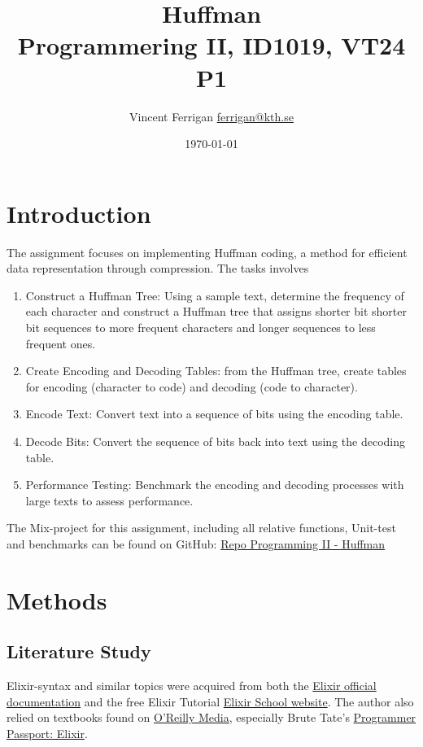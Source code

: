 \documentclass[a4paper,11pt]{article}
\begin{document}
\title{
    Huffman
\\\small{Programmering II, ID1019, VT24 P1}
}
\author{Vincent Ferrigan \href{mailto:ferrigan@kth.se}{ferrigan@kth.se}}

\date{\today}
\maketitle

\section*{Introduction}
\label{sec:introduction}
The assignment focuses on implementing Huffman coding, a method for
efficient data representation through compression.
The tasks involves
\begin{enumerate}
    \item Construct a Huffman Tree:
    Using a sample text, determine the frequency of each character and construct a Huffman tree that assigns shorter bit shorter bit sequences to more frequent characters and longer sequences to less frequent ones.
    \item Create Encoding and Decoding Tables: 
    from the Huffman tree, create tables for encoding (character to code) and decoding (code to character).
    \item Encode Text:
    Convert text into a sequence of bits using the encoding table.
    \item Decode Bits: 
    Convert the sequence of bits back into text using the decoding table.
    \item Performance Testing: 
    Benchmark the encoding and decoding processes with large texts to assess
    performance.
\end{enumerate}

The Mix-project for this assignment, including all relative functions, Unit-test and benchmarks can be found on GitHub:
\href{https://github.com/VincentFerrigan/kth-id1019-programming-ii/tree/main/tasks/8/huffman}{Repo Programming II - Huffman}%

\clearpage
\section*{Methods}\label{sec:methods}
\subsection*{Literature Study}
\label{subsec:literaturestudy}
Elixir-syntax and similar topics were acquired
from both the
\href{https://elixir-lang.org/docs.html}{Elixir official documentation}
and the free Elixir Tutorial
\href{https://elixirschool.com/en}{Elixir School
website}.
The author also relied on textbooks found on
\href{https://learning.oreilly.com}{O'Reilly Media},
especially Brute Tate's
\href{https://learning.oreilly.com/library/view/programmer-passport-elixir/9781680509649/}{Programmer Passport: Elixir}.
\end{document}
